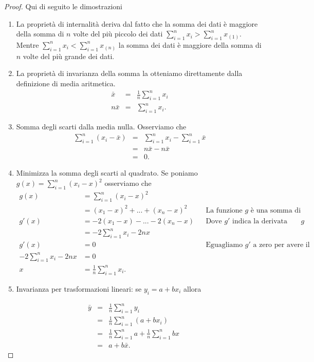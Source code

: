 \documentclass[
  11pt,
]{book}
\theoremstyle{mytheoremstyle}
\theoremstyle{mydefstyle}
\begin{document}
\begin{proof}
Qui di seguito le dimostrazioni

\begin{enumerate}
\def\labelenumi{\arabic{enumi}.}
\setcounter{enumi}{-1}
\item
  La proprietà di internalità deriva dal fatto che la somma dei dati è maggiore della
  somma di \(n\) volte del più piccolo dei dati \(\sum_{i=1}^n x_i>\sum_{i=1}^n x_{(1)}\). Mentre
  \(\sum_{i=1}^n x_i<\sum_{i=1}^n x_{(n)}\) la somma dei dati è maggiore della
  somma di \(n\) volte del più grande dei dati.
\item
  La proprietà di invarianza della somma la otteniamo direttamente dalla definizione di media aritmetica.
  \begin{eqnarray*}
    \bar x &=&  \frac 1n\sum_{i=1}^nx_i\\
    n\bar x&=&\sum_{i=1}^nx_i.
  \end{eqnarray*}
\item
  Somma degli scarti dalla media nulla.
  Osserviamo che
  \begin{eqnarray*}
    \sum_{i=1}^n(x_i-\bar x) &=&  \sum_{i=1}^n x_i-\sum_{i=1}^n\bar x\\
    &=& n\bar x -n\bar x\\
    &=&0.
  \end{eqnarray*}
\item
  Minimizza la somma degli scarti al quadrato. Se poniamo \(g(x)=\sum_{i=1}^{n} (x_{i} - x)^{2}\)
  osserviamo che
  \begin{align*}
    g(x) &= \sum_{i=1}^n(x_i-x)^2 \\
    &=  (x_1- x)^2+...+(x_n- x)^2 && \text{La funzione $g$ è una somma di parabole}\\
    g'(x) &= -2(x_1- x)-...-2(x_n- x) && \text{Dove $g'$ indica la derivata prima di $g$}\\
    &= -2\sum_{i=1}^nx_i -2nx\\
    g'(x) &= 0 && \text{Eguagliamo $g'$ a zero per avere il minimo}\\
  -2\sum_{i=1}^nx_i -2nx&=0\\
  x&=\frac 1n\sum_{i=1}^nx_i.
  \end{align*}
\item
  Invarianza per trasformazioni lineari:
  se \(y_i=a+bx_i\) allora
\end{enumerate}

\begin{eqnarray*}
  \bar y &=& \frac 1n\sum_{i=1}^n y_i \\
  &=&  \frac 1n\sum_{i=1}^n (a+bx_i)\\
  &=& \frac 1n\sum_{i=1}^n a + \frac 1n\sum_{i=1}^n bx\\
  &=& a+b\bar x.
\end{eqnarray*}


\end{proof}
\end{document}
